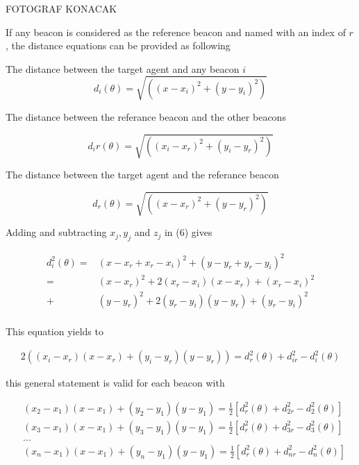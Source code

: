\documentclass[twoside]{article}
\begin{document}
\begin{multicols}{2}
FOTOGRAF KONACAK

If any beacon is considered as the reference beacon and named with an index of $r$, the distance equations can be provided as following 

The distance between the target agent and any beacon $i$
\begin{equation}
  d_i(\theta) = \sqrt{\left((x - x_i)^2 + (y - y_i)^2\right)}
\end{equation}

The distance between the referance beacon and the other beacons

\begin{equation}
d_ir(\theta) = \sqrt{\left((x_i - x_r)^2 + (y_i - y_r)^2\right)}
\end{equation}

The distance between the target agent and the referance beacon

\begin{equation}
d_r(\theta) = \sqrt{\left((x - x_r)^2 + (y - y_r)^2\right)}
\end{equation}

Adding and subtracting $x_j, y_j$ and $z_j$ in (6) gives

\begin{align*}
d_i^2(\theta) = & (x - x_r + x_r - x_i)^2 + (y - y_r + y_r - y_i)^2 \\
              = & (x - x_r)^2 + 2(x_r - x_i)(x - x_r) + (x_r-x_i)^2 \\ 
              + & (y - y_r)^2 + 2(y_r - y_i)(y - y_r) + (y_r - y_i)^2 \\               
\end{align*}


This equation yields to

\begin{align*}
 2((x_i - x_r)(x - x_r) + (y_i - y_r)(y - y_r)) = d_r^2(\theta) + d_{ir}^2 - d_i^2(\theta)
\end{align*}

this general statement is valid for each beacon with

\begin{align*}
  & (x_2 - x_1)(x - x_1) + (y_2 - y_1)(y - y_1) = \frac{1}{2} [d_r^2(\theta) + d_{2r}^2 - d_2^2(\theta)] \\
  & (x_3 - x_1)(x - x_1) + (y_3 - y_1)(y - y_1) = \frac{1}{2} [d_r^2(\theta) + d_{3r}^2 - d_3^2(\theta)] \\
  & ... \\
  & (x_n - x_1)(x - x_1) + (y_n - y_1)(y - y_1) = \frac{1}{2} [d_r^2(\theta) + d_{nr}^2 - d_n^2(\theta)] \\
\end{align*}


\end{multicols}
\end{document}
